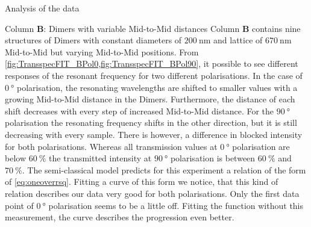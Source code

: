 \documentclass[pdftex, a4paper,11pt, twoside, UKenglish]{report}
\begin{document}
\begin{chapter}{Analysis of the data}
    \newpage
    \begin{section}{Column \textbf{B}: Dimers with variable Mid-to-Mid
        distances}
      \label{chp:DataB}
      Column \textbf{B} contains nine structures of Dimers with constant
      diameters of $\SI{200}{\nano\meter}$ and lattice of
      $\SI{670}{\nano\meter}$ Mid-to-Mid but varying Mid-to-Mid positions. From
      \cref{fig:TransspecFIT_BPol0,fig:TransspecFIT_BPol90}, it possible to see
      different responses of the resonant frequency for two different
      polarisations. In the case of $\SI{0}{\degree}$ polarisation, the
      resonating wavelengths are shifted to smaller values with a growing
      Mid-to-Mid distance in the Dimers. Furthermore, the distance of each
      shift decreases with every step of increased Mid-to-Mid distance.
      For the $\SI{90}{\degree}$ polarisation the resonating frequency shifts
      in the other direction, but it is still decreasing with every sample.
      There is however, a difference in blocked intensity for both
      polarisations. Whereas all transmission values at $\SI{0}{\degree}$
      polarisation are below $\SI{60}{\percent}$ the transmitted intensity
      at $\SI{90}{\degree}$ polarisation is between $\SI{60}{\percent}$ and 
      $\SI{70}{\percent}$.\newline
      The semi-classical model predicts for this experiment a relation of the
      form of \cref{eq:oneoverrsq}. Fitting a curve of this form we notice,
      that this kind of relation describes our data very good for both
      polarisations. Only the first data point of $\SI{0}{\degree}$ polarisation
      seems to be a little off. Fitting the function without this measurement,
      the curve describes the progression even better.
      

\end{section}
\end{chapter}
\end{document}
